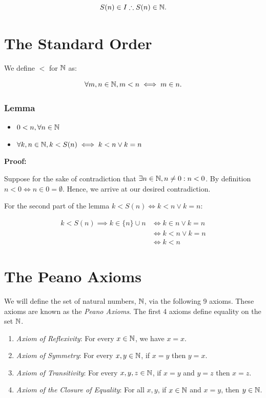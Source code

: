 \[
	S(n) \in I \therefore S(n) \in \mathbb{N}.
\]

\section{The Standard Order}

We define \(<\) for \(\mathbb{N}\) as: 

\[
	\forall m, n \in \mathbb{N}, m < n \iff m \in n.
\]

\subsubsection*{Lemma}

\begin{itemize}
	\item \(0 < n, \forall n \in \mathbb{N}\)
	\item \(\forall k,n \in \mathbb{N}, k < S(n) \iff k < n \lor k = n\)
\end{itemize}

\textbf{Proof:}

Suppose for the sake of contradiction that \(\exists n \in \mathbb{N}, n \ne 0: n < 0\). By definition 
\(n < 0 \iff n \in 0 = \emptyset\). Hence, we arrive at our desired contradiction.

For the second part of the lemma \(k < S(n) \iff k < n \lor k = n\):

\begin{align*}
	k < S(n) \implies k \in \{n\} \cup n &\iff k \in n \lor k = n \\ 
										 &\iff k < n \lor k = n \\
										 &\iff k < n
\end{align*}

\QED

\section{The Peano Axioms}

We will define the set of natural numbers, \( \mathbb{N} \), via the following 9 axioms. 
These axioms are known as the \emph{Peano Axioms}. The first 4 axioms define equality on 
the set \( \mathbb{N} \).

\begin{enumerate}[label=\Roman*.]

	\item \emph{Axiom of Reflexivity}: For every \( x \in \mathbb{N} \), we have \( x = x \).
	
	\item \emph{Axiom of Symmetry}: For every \( x, y \in \mathbb{N} \), if \( x = y \) then \( y = x \).
	
	\item \emph{Axiom of Transitivity}: For every \( x, y, z \in \mathbb{N} \), if \( x = y \) and \( y = z \) then \( x = z \). 
	
	\item \emph{Axiom of the Closure of Equality}: For all \( x, y \), if \( x \in \mathbb{N} \) and \( x = y \), then \( y \in \mathbb{N} \).\hfill 

\end{enumerate}

